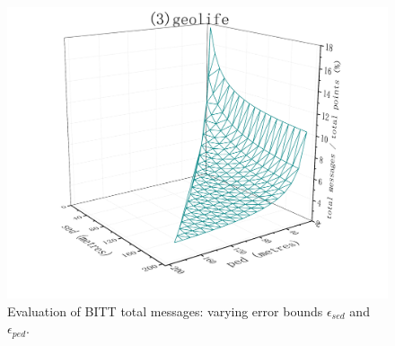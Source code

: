 {\begin{figure}[tb!]
	\includegraphics[scale = 0.210]{figures/Fig-BITT-geolife-total-messages.png}\hspace{1ex}
	\vspace{-2ex}
	\caption{\small Evaluation of BITT total messages: varying error bounds $\epsilon_{sed}$ and $\epsilon_{ped}$.}
	\label{fig:bitt-total-message}
	\vspace{-1ex}
\end{figure}




}
